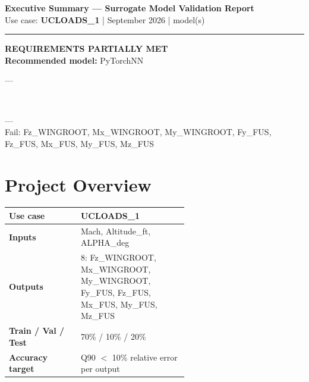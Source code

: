 \documentclass[9pt,a4paper]{article}
\begin{document}
\thispagestyle{fancy}

\begin{center}
  {\large\bfseries\color{primary} Executive Summary --- Surrogate Model Validation Report}\\[2pt]
  {\small\color{sepgray} Use case: \textbf{UCLOADS\_1} \quad| September 2026 \quad| model(s)}
\end{center}
\vspace{-4pt}\noindent\rule{\linewidth}{1pt}\vspace{3pt}

\begin{center}
\colorbox{warnamber}{\begin{minipage}{0.66\linewidth}
  \vspace{5pt}\centering
  {\normalsize\bfseries REQUIREMENTS PARTIALLY MET}\\[4pt]
  {\small\bfseries Recommended model:} {\small PyTorchNN}\\[5pt]
\colorbox{r2green}{\begin{minipage}{0.97\linewidth}\vspace{2pt} \enspace---\vspace{2pt}\end{minipage}}\\[2pt]
\colorbox{failred}{\begin{minipage}{0.97\linewidth}\vspace{2pt} \enspace---\\[1pt]{\footnotesize\color{red} Fail: Fz\_WINGROOT, Mx\_WINGROOT, My\_WINGROOT, Fy\_FUS, Fz\_FUS, Mx\_FUS, My\_FUS, Mz\_FUS}\vspace{2pt}\end{minipage}}
  \vspace{5pt}
\end{minipage}}
\end{center}

\section{Project Overview}
\renewcommand{\arraystretch}{1.2}
\begin{tabular}{|l|p{0.60\linewidth}|}
  \hline
  \textbf{Use case}           & UCLOADS\_1 \\ \hline
  \textbf{Inputs}             & Mach, Altitude\_ft, ALPHA\_deg \\ \hline
  \textbf{Outputs}            & 8: Fz\_WINGROOT, Mx\_WINGROOT, My\_WINGROOT, Fy\_FUS, Fz\_FUS, Mx\_FUS, My\_FUS, Mz\_FUS \\ \hline
  \textbf{Train / Val / Test} & 70\% / 10\% / 20\% \\ \hline
  \textbf{Accuracy target}    & Q90 $<$ 10\% relative error per output \\ \hline
\end{tabular}
\end{document}
